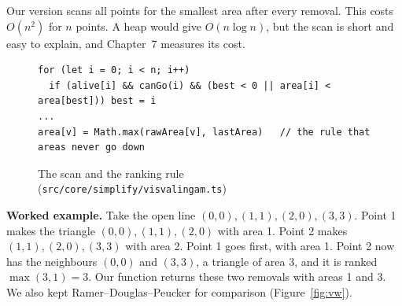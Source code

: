 Our version scans all points for the smallest area after every removal. This costs $O(n^2)$ for $n$ points. A heap would give $O(n\log n)$, but the scan is short and easy to explain, and Chapter~7 measures its cost.

\begin{figure}[H]
\centering
\begin{lstlisting}[style=code]
for (let i = 0; i < n; i++)
  if (alive[i] && canGo(i) && (best < 0 || area[i] < area[best])) best = i
...
area[v] = Math.max(rawArea[v], lastArea)   // the rule that areas never go down
\end{lstlisting}
\caption{The scan and the ranking rule (\texttt{src/core/simplify/visvalingam.ts})}
\label{fig:vwcode}
\end{figure}

\textbf{Worked example.} Take the open line $(0,0),(1,1),(2,0),(3,3)$. Point 1 makes the triangle $(0,0),(1,1),(2,0)$ with area 1. Point 2 makes $(1,1),(2,0),(3,3)$ with area 2. Point 1 goes first, with area 1. Point 2 now has the neighbours $(0,0)$ and $(3,3)$, a triangle of area 3, and it is ranked $\max(3,1)=3$. Our function returns these two removals with areas 1 and 3. We also kept Ramer--Douglas--Peucker \cite{ramer1972,douglas1973} for comparison (Figure~\ref{fig:vw}).

